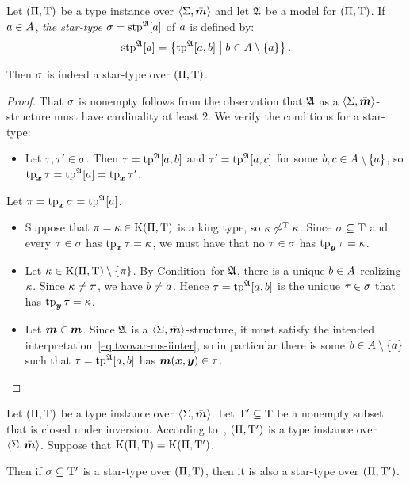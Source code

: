 \begin{definition}\label{def:stp-str}
Let $(\Pi,\mathrm{T})$ be a type instance over $\left\langle \mathrm{\Sigma},\bar{\bm{m}} \right\rangle$
and let $\mathfrak{A}$ be a model for $(\Pi,\mathrm{T})$.
If $a \in A$, \emph{the star-type} $\sigma = \operatorname{stp}^{\mathfrak{A}}[a]$ of $a$ is
defined by:
\[
  \operatorname{stp}^{\mathfrak{A}}[a] = \left\{\operatorname{tp}^{\mathfrak{A}}[a,b]\mathrel{}\middle|\mathrel{}b \in A \setminus \left\{a\right\}\right\}.
\]
\end{definition}
\begin{remark}\label{rem:stp-str}
Then $\sigma$ is indeed a star-type over $(\Pi,\mathrm{T})$.
\end{remark}
\begin{proof}
That $\sigma$ is nonempty follows from the observation that $\mathfrak{A}$ as a
$\left\langle \mathrm{\Sigma},\bar{\bm{m}} \right\rangle$-structure must have cardinality at least $2$.
We verify the conditions for a star-type:
\begin{itemize}
  \item[\refcondstpx]
  Let $\tau,{\tau'} \in \sigma$. 
  Then $\tau = \operatorname{tp}^{\mathfrak{A}}[a,b]$ and ${\tau'} = \operatorname{tp}^{\mathfrak{A}}[a,c]$ for some
  $b,c \in A \setminus \left\{a\right\}$, so $\operatorname{tp}_{\bm{x}}\tau = \operatorname{tp}^{\mathfrak{A}}[a] =
  \operatorname{tp}_{\bm{x}}{\tau'}$.
\end{itemize}
  Let $\pi = \operatorname{tp}_{\bm{x}}\sigma = \operatorname{tp}^{\mathfrak{A}}[a]$.
\begin{itemize}[resume]
  \item[\refcondstpkx]
  Suppose that $\pi = \kappa \in \mathrm{K}(\Pi,\mathrm{T})$ is a king type,
  so $\kappa \not\sim^{\mathrm{T}} \kappa$. Since $\sigma \subseteq \mathrm{T}$ and every
  $\tau \in \sigma$ has $\operatorname{tp}_{\bm{x}}\tau = \kappa$, we must have that no 
  $\tau \in \sigma$ has $\operatorname{tp}_{\bm{y}}\tau = \kappa$.
  \item[\refcondstpky]
  Let $\kappa \in \mathrm{K}(\Pi,\mathrm{T}) \setminus \left\{\pi\right\}$. By
  Condition~ for $\mathfrak{A}$, there is a unique $b \in A$
  realizing $\kappa$. Since $\kappa \neq \pi$, we have $b \neq a$.
  Hence $\tau = \operatorname{tp}^{\mathfrak{A}}[a,b]$ is the unique $\tau \in \sigma$ that has
  $\operatorname{tp}_{\bm{y}}\tau = \kappa$.
  \item[\refcondstpm]
  Let $\bm{m} \in \bar{\bm{m}}$. Since $\mathfrak{A}$ is a $\left\langle \mathrm{\Sigma},\bar{\bm{m}} \right\rangle$-structure, it must
  satisfy the intended interpretation~\cref{eq:twovar-ms-iinter}, so in
  particular there is some $b \in A \setminus \left\{a\right\}$ such that $\tau =
  \operatorname{tp}^{\mathfrak{A}}[a,b]$ has $\bm{m}(\bm{x},\bm{y}) \in \tau$.
\end{itemize}
\end{proof}
\begin{remark}\label{rem:stp-sub}
Let $(\Pi,\mathrm{T})$ be a type instance over $\left\langle \mathrm{\Sigma},\bar{\bm{m}} \right\rangle$. Let ${\mathrm{T}'}
\subseteq \mathrm{T}$ be a nonempty subset that is closed under inversion. According
to~, $(\Pi,{\mathrm{T}'})$ is a type instance over
$\left\langle \mathrm{\Sigma},\bar{\bm{m}} \right\rangle$. Suppose that $\mathrm{K}(\Pi,\mathrm{T}) = \mathrm{K}(\Pi,{\mathrm{T}'})$.

Then if $\sigma \subseteq {\mathrm{T}'}$ is a star-type over $(\Pi,\mathrm{T})$, then it
is also a star-type over $(\Pi,{\mathrm{T}'})$.
\end{remark}
